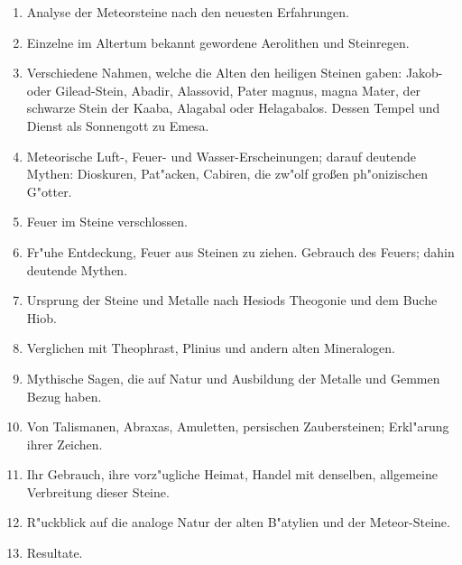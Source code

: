 \documentclass[a4paper, 11pt, oneside, polutonikogreek, german]{article}
\begin{document}
\begin{enumerate}
\begin{enumerate}
        \item Analyse der Meteorsteine nach den neuesten Erfahrungen.
        \item Einzelne im Altertum bekannt gewordene Aerolithen und Steinregen.
        \item Verschiedene Nahmen, welche die Alten den heiligen Steinen gaben: Jakob- oder Gilead-Stein, Abadir, Alassovid, Pater magnus, magna Mater, der schwarze Stein der Kaaba, Alagabal oder Helagabalos. Dessen Tempel und Dienst als Sonnengott zu Emesa.
        \item Meteorische Luft-, Feuer- und Wasser-Erscheinungen; darauf deutende Mythen: Dioskuren, Pat"acken, Cabiren, die zw"olf großen ph"onizischen G"otter.
        \item Feuer im Steine verschlossen.
        \item Fr"uhe Entdeckung, Feuer aus Steinen zu ziehen. Gebrauch des Feuers; dahin deutende Mythen.
        \item Ursprung der Steine und Metalle nach Hesiods Theogonie und dem Buche Hiob.
        \item Verglichen mit Theophrast, Plinius und andern alten Mineralogen.
        \item Mythische Sagen, die auf Natur und Ausbildung der Metalle und Gemmen Bezug haben.
        \item Von Talismanen, Abraxas, Amuletten, persischen Zaubersteinen; Erkl"arung ihrer Zeichen.
        \item Ihr Gebrauch, ihre vorz"ugliche Heimat, Handel mit denselben, allgemeine Verbreitung dieser Steine.
        \item R"uckblick auf die analoge Natur der alten B"atylien und der Meteor-Steine.
        \item Resultate.
    \end{enumerate}
\end{enumerate}
\clearpage
\end{document}
